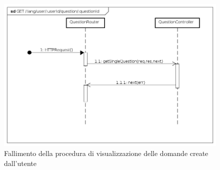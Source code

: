 \begin{itemize}
\begin{figure}[ht]
	\centering
	\includegraphics[scale=0.45]{UML/DiagrammiDiSequenza/Back-end/GET__lang_user__userId_question__questionId_failure.png}
	\caption{Fallimento della procedura di visualizzazione delle domande create dall'utente}
\end{figure}
\FloatBarrier

\end{itemize}






